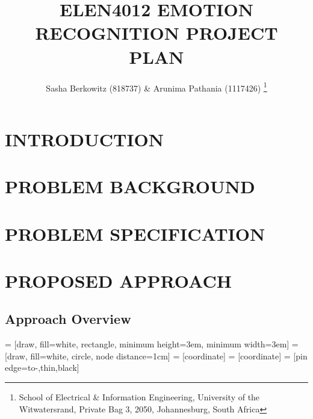 \documentclass[10pt,twocolumn]{witseiepaper}
\begin{document}
\title{ELEN4012 EMOTION RECOGNITION PROJECT PLAN}

\author{Sasha Berkowitz (818737) \& Arunima Pathania (1117426)
\thanks{School of Electrical \& Information Engineering, University of the
Witwatersrand, Private Bag 3, 2050, Johannesburg, South Africa}
}


%
\abstract{ }

\keywords{}

\maketitle
\pagestyle{plain}
\setcounter{page}{1}


\section{INTRODUCTION}

\section{PROBLEM BACKGROUND} %


\section{PROBLEM SPECIFICATION}\label{spec} %

\section{PROPOSED APPROACH}\label{approach} %

\subsection{Approach Overview}

 = [draw, fill=white, rectangle, 
minimum height=3em, minimum width=3em]
 = [draw, fill=white, circle, node distance=1cm]
 = [coordinate]
 = [coordinate]
 = [pin edge={to-,thin,black}]
\end{document}
